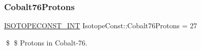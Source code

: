 \subsubsection{\texorpdfstring{Cobalt76\+Protons}{Cobalt76Protons}}
{\footnotesize\ttfamily \mbox{\hyperlink{group___isotope_const-_macros_ga5f18360b3e99483a35c32d789e62621c}{I\+S\+O\+T\+O\+P\+E\+C\+O\+N\+S\+T\+\_\+\+I\+NT}} Isotope\+Const\+::\+Cobalt76\+Protons = 27}

\$ \$ Protons in Cobalt-\/76. 